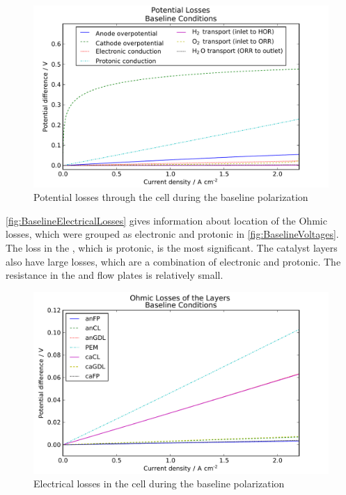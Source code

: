 \begin{figure}[htbp]
  \includegraphics[width=\linewidth]{Results/Cell/Model/1/PotentialLosses}%
  \caption{Potential losses through the cell during the baseline polarization}%
  \label{fig:BaselineVoltages}
\end{figure}

\autoref{fig:BaselineElectricalLosses} gives information about location of the Ohmic losses, which were grouped as electronic and protonic in \autoref{fig:BaselineVoltages}.  The loss in the , which is protonic, is the most significant.  The catalyst layers also have large losses, which are a combination of electronic and protonic.  The resistance in the  and flow plates is relatively small.

\begin{figure}[htbp]
  \includegraphics[width=\linewidth]{Results/Cell/Model/1/ElectricalLosses}%
  \caption{Electrical losses in the cell during the baseline polarization}%
  \label{fig:BaselineElectricalLosses}
\end{figure}

